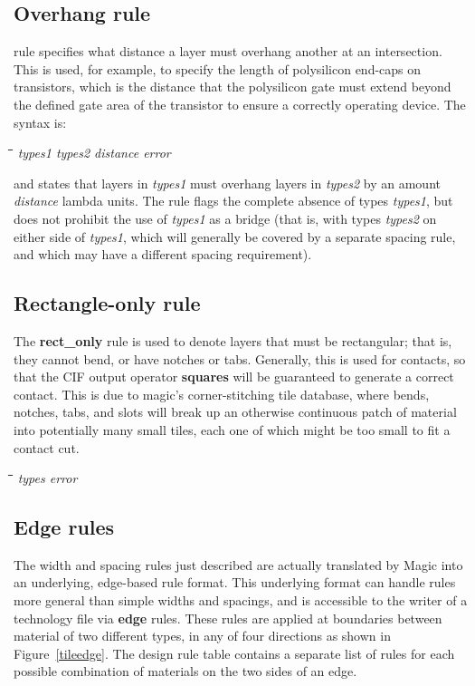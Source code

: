 \documentclass[letterpaper,twoside,12pt]{article}
\def\hinch{\hspace*{0.5in}}
\def\starti{\begin{center}\begin{tabbing}\hinch\=\hinch\=\hinch\=\hinch\=\kill}
\def\endi{\end{tabbing}\end{center}}
\def\ii{\>\>\>}
\begin{document}
\subsection{Overhang rule} rule specifies what distance a layer must overhang
another at an intersection.  This is used, for example, to specify the length
of polysilicon end-caps on transistors, which is the distance that the
polysilicon gate must extend beyond the defined gate area of the transistor
to ensure a correctly operating device.  The syntax is:

\starti
   \ii {\bfseries overhang} {\itshape types1 types2 distance error}
\endi

and states that layers in {\itshape types1} must overhang layers in
{\itshape types2} by an amount {\itshape distance} lambda units.  The
rule flags the complete absence of types {\itshape types1}, but does not
prohibit the use of {\itshape types1} as a bridge (that is, with
types {\itshape types2} on either side of {\itshape types1}, which
will generally be covered by a separate spacing rule, and which may
have a different spacing requirement). 

\subsection{Rectangle-only rule}

The {\bfseries rect\_only} rule is used to denote layers that must be
rectangular;  that is, they cannot bend, or have notches or tabs.
Generally, this is used for contacts, so that the CIF output operator
{\bfseries squares} will be guaranteed to generate a correct contact.
This is due to magic's corner-stitching tile database, where bends,
notches, tabs, and slots will break up an otherwise continuous patch
of material into potentially many small tiles, each one of which
might be too small to fit a contact cut.

\starti
   \ii {\bfseries rect\_only} {\itshape types error}
\endi

\subsection{Edge rules}

The width and spacing rules just described are actually translated
by Magic into an underlying, edge-based rule format.  This underlying
format can handle rules more general than simple widths and spacings,
and is accessible to the writer of a technology file via {\bfseries edge} rules.
These rules are applied at boundaries between material of
two different types, in any of four directions as shown in Figure~\ref{tileedge}.
The design rule table contains a separate list of rules for each possible
combination of materials on the two sides of an edge.
\end{document}
